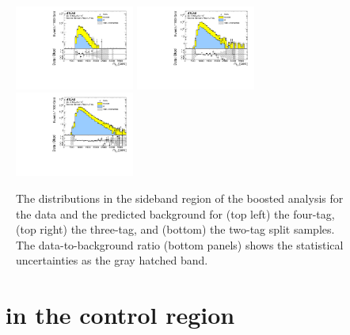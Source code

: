 \begin{figure}[htbp!]
\begin{center}
 \includegraphics[width=0.35\textwidth,angle=-90]{figures/boosted/Paperplot/Moriond_bkg_9_FourTag_Sideband_mHH_l_1.pdf}
 \includegraphics[width=0.35\textwidth,angle=-90]{figures/boosted/Paperplot/Moriond_bkg_9_ThreeTag_Sideband_mHH_l_1.pdf}\\
 \includegraphics[width=0.35\textwidth,angle=-90]{figures/boosted/Paperplot/Moriond_bkg_9_TwoTag_split_Sideband_mHH_l_1.pdf}\\
\caption{The \mtwoJ distributions in the sideband region of the boosted analysis for the data and the predicted background for (top left) the four-tag, (top right) the three-tag, and (bottom) the two-tag split samples. The data-to-background ratio (bottom panels) shows the statistical uncertainties as the gray hatched band.}
\label{fig:boosted-sb-mjj}
\end{center}
\end{figure}

\clearpage
\section{\mtwoJ~ in the control region}
\label{sec:boosted-cr}

